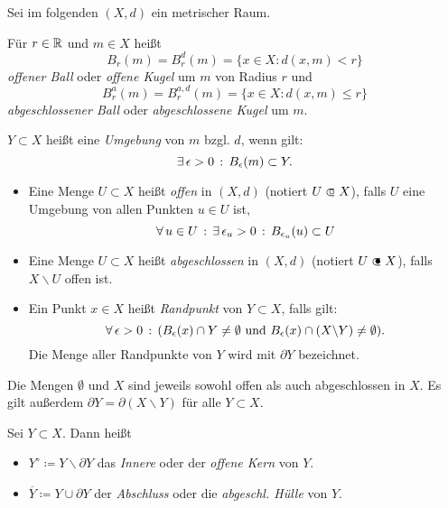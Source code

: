 \documentclass{cheat-sheet}
\begin{document}
\begin{nota}
  Sei im folgenden $(X, d)$ ein metrischer Raum.
\end{nota}


\begin{defn}
  Für $r \in \mathbb{R}$ und $m \in X$ heißt
  \[ B_r(m) = B_r^d(m) = \{ x \in X : d(x, m) < r \} \]
  \emph{offener Ball} oder \emph{offene Kugel} um $m$ von Radius $r$ und
  \[ B_r^a(m) = B_r^{a,d}(m) = \{ x \in X : d(x, m) \le r \} \]
  \emph{abgeschlossener Ball} oder \emph{abgeschlossene Kugel} um $m$.
\end{defn}

\begin{defn}
  $Y \subset X$ heißt eine \emph{Umgebung} von $m$ bzgl. $d$, wenn gilt:
  \[ \exists \, {\epsilon > 0} \,:\, B_{\epsilon}(m) \subset Y. \]
\end{defn}

\begin{defn}
  \begin{itemize}
    \item Eine Menge $U \subset X$ heißt \emph{offen} in $(X, d)$ (notiert $U \opn X$), falls $U$ eine Umgebung von allen Punkten $u \in U$ ist, \dh{}
    \[ \forall \, {u \in U} \,:\, \exists \, {\epsilon_u > 0} \,:\, B_{\epsilon_u}(u) \subset U \]
    \item Eine Menge $U \subset X$ heißt \emph{abgeschlossen} in $(X, d)$ (notiert $U \cls X$), falls $X \backslash U$ offen ist.
    \item Ein Punkt $x \in X$ heißt \emph{Randpunkt} von $Y \subset X$, falls gilt:
    \[ \forall \, {\epsilon > 0} \,:\, ( B_{\epsilon}(x) \cap Y \not= \emptyset \text{ und } B_{\epsilon}(x) \cap (X \backslash Y) \not= \emptyset). \]
    Die Menge aller Randpunkte von $Y$ wird mit \emph{$\partial Y$} bezeichnet.
  \end{itemize}
\end{defn}

\begin{bem}
  Die Mengen $\emptyset$ und $X$ sind jeweils sowohl offen als auch abgeschlossen in $X$. Es gilt außerdem $\partial Y = \partial (X \backslash Y)$ für alle $Y \subset X$.
\end{bem}

\begin{defn}
  Sei $Y \subset X$. Dann heißt
  \begin{itemize}
    \item $Y^{\circ} \coloneqq Y \backslash \partial Y$ das \emph{Innere} oder der \emph{offene Kern} von $Y$.
    \item $\overline{Y} \coloneqq Y \cup \partial Y$ der \emph{Abschluss} oder die \emph{abgeschl. Hülle} von $Y$.
  \end{itemize}
\end{defn}
\end{document}
